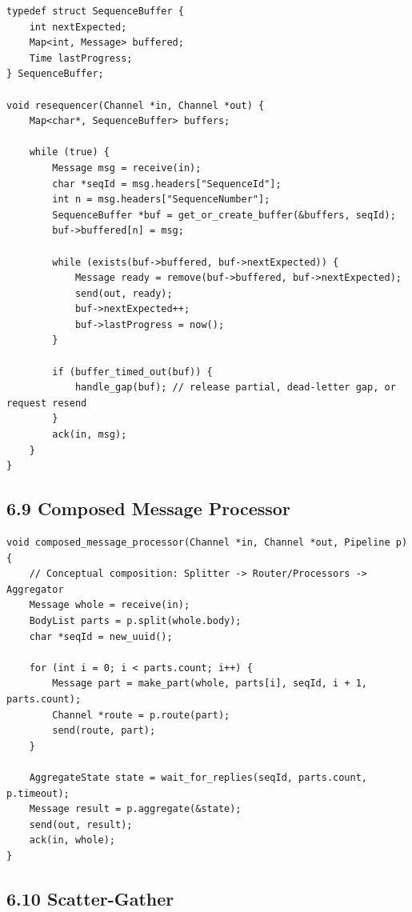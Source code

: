 \documentclass[11pt]{article}
\begin{document}
\begin{verbatim}
typedef struct SequenceBuffer {
    int nextExpected;
    Map<int, Message> buffered;
    Time lastProgress;
} SequenceBuffer;

void resequencer(Channel *in, Channel *out) {
    Map<char*, SequenceBuffer> buffers;

    while (true) {
        Message msg = receive(in);
        char *seqId = msg.headers["SequenceId"];
        int n = msg.headers["SequenceNumber"];
        SequenceBuffer *buf = get_or_create_buffer(&buffers, seqId);
        buf->buffered[n] = msg;

        while (exists(buf->buffered, buf->nextExpected)) {
            Message ready = remove(buf->buffered, buf->nextExpected);
            send(out, ready);
            buf->nextExpected++;
            buf->lastProgress = now();
        }

        if (buffer_timed_out(buf)) {
            handle_gap(buf); // release partial, dead-letter gap, or request resend
        }
        ack(in, msg);
    }
}
\end{verbatim}

\subsection{6.9 Composed Message
Processor}\label{composed-message-processor}

\begin{verbatim}
void composed_message_processor(Channel *in, Channel *out, Pipeline p) {
    // Conceptual composition: Splitter -> Router/Processors -> Aggregator
    Message whole = receive(in);
    BodyList parts = p.split(whole.body);
    char *seqId = new_uuid();

    for (int i = 0; i < parts.count; i++) {
        Message part = make_part(whole, parts[i], seqId, i + 1, parts.count);
        Channel *route = p.route(part);
        send(route, part);
    }

    AggregateState state = wait_for_replies(seqId, parts.count, p.timeout);
    Message result = p.aggregate(&state);
    send(out, result);
    ack(in, whole);
}
\end{verbatim}

\subsection{6.10 Scatter-Gather}\label{scatter-gather}
\end{document}
